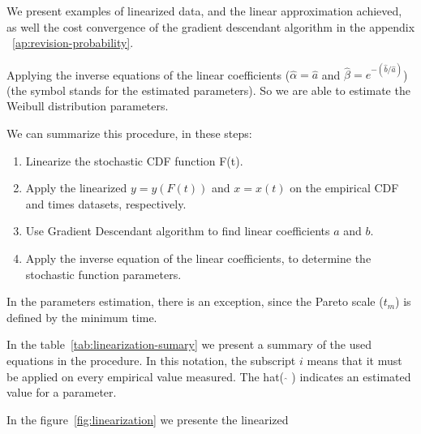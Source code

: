 We present examples of linearized data, and the linear approximation achieved, as well the cost convergence of the gradient descendant algorithm in the appendix ~\ref{ap:revision-probability}.

Applying the inverse equations of the linear coefficients ($\hat{\alpha} = \hat{a}$ and $\hat{\beta} = e^{-(\hat{b}/\hat{a})}$) (the symbol stands for the estimated parameters). So we are able to estimate the Weibull distribution parameters.

We can summarize this procedure, in these steps:
\begin{enumerate}
\item Linearize the stochastic CDF function F(t).
\item Apply the linearized $y = y(F(t))$ and  $x = x(t)$ on the empirical CDF and times datasets, respectively. 
\item Use Gradient Descendant algorithm to find linear coefficients $a$ and $b$.
\item Apply the inverse equation of the linear coefficients, to determine the stochastic function parameters.
\end{enumerate}

In the parameters estimation, there is an exception, since the Pareto scale ($t_{m}$) is defined by the minimum time. 

In the table~\ref{tab:linearization-sumary} we present a summary of the used equations in the procedure. In this notation, the subscript $i$ means that it must be applied on every empirical value measured. The hat( $\widehat{}$ ) indicates an estimated value for a parameter.

In the figure~\ref{fig:linearization} we presente the linearized 


